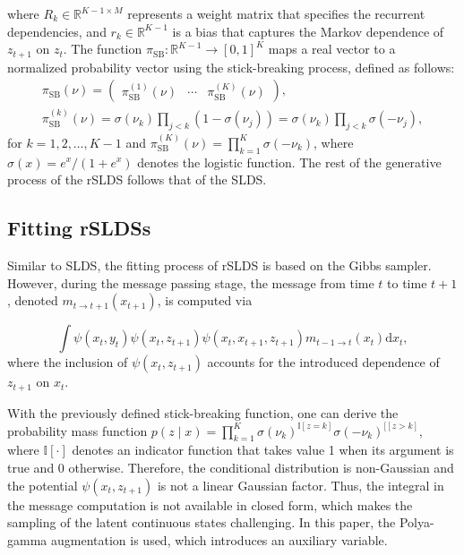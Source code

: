 where $R_{k} \in \mathbb{R}^{K-1 \times M}$ represents a weight matrix that specifies the recurrent dependencies, and $r_{k} \in \mathbb{R}^{K-1}$ is a bias that captures the Markov dependence of $z_{t+1}$ on $z_{t}$. The function $\pi_{\mathrm{SB}}: \mathbb{R}^{K-1} \rightarrow[0,1]^{K}$ maps a real vector to a normalized probability vector using the stick-breaking process, defined as follows:
$$
\begin{gathered}
\pi_{\mathrm{SB}}(\nu)=\left(\begin{array}{lll}
\pi_{\mathrm{SB}}^{(1)}(\nu) & \cdots & \pi_{\mathrm{SB}}^{(K)}(\nu)
\end{array}\right), \\
\pi_{\mathrm{SB}}^{(k)}(\nu)=\sigma\left(\nu_{k}\right) \prod_{j<k}\left(1-\sigma\left(\nu_{j}\right)\right)=\sigma\left(\nu_{k}\right) \prod_{j<k} \sigma\left(-\nu_{j}\right),
\end{gathered}
$$
for $k=1,2, \ldots, K-1$ and $\pi_{\mathrm{SB}}^{(K)}(\nu)=\prod_{k=1}^{K} \sigma\left(-\nu_{k}\right)$, where $\sigma(x)=e^{x} /\left(1+e^{x}\right)$ denotes the logistic function. The rest of the generative process of the rSLDS follows that of the SLDS. 

\subsection{Fitting rSLDSs} 
Similar to SLDS, the fitting process of rSLDS is based on the Gibbs sampler. However, during the message passing stage, the message from time $t$ to time $t+1$, denoted $m_{t \rightarrow t+1}\left(x_{t+1}\right)$, is computed via

$$
\int \psi\left(x_{t}, y_{t}\right) \psi\left(x_{t}, z_{t+1}\right) \psi\left(x_{t}, x_{t+1}, z_{t+1}\right) m_{t-1 \rightarrow t}\left(x_{t}\right) \mathrm{d} x_{t},
$$ 
where the inclusion of $\psi\left(x_{t}, z_{t+1}\right)$ accounts for the introduced dependence of $z_{t+1}$ on $x_t$.

With the previously defined stick-breaking function, one can derive the probability mass function $p(z \mid x)=\prod_{k=1}^{K} \sigma\left(\nu_{k}\right)^{\mathbb{I}[z=k]} \sigma\left(-\nu_{k}\right)^{\mathbb{[}[z>k]}
$, where $\mathbb{I}[\cdot]$ denotes an indicator function that takes value 1 when its argument is true and 0 otherwise. Therefore, the conditional distribution is non-Gaussian and the potential $\psi\left(x_{t}, z_{t+1}\right)$ is not a linear Gaussian factor. Thus, the integral in the message computation is not available in closed form, which makes the sampling of the latent continuous states challenging. In this paper, the Polya-gamma augmentation \cite{linderman_dependent_2015} is used, which introduces an auxiliary variable.

